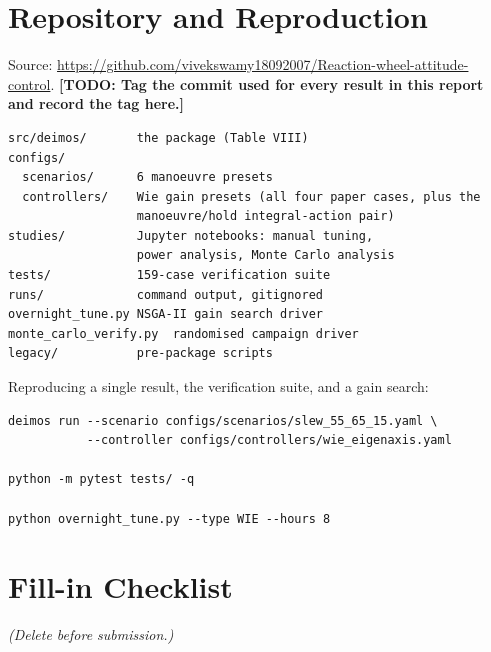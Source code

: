 \documentclass[conference,10pt,a4paper]{IEEEtran}
\newcommand{\TODO}[1]{\textbf{[TODO: #1]}}
\newcommand{\NOTE}[1]{{\small\textit{(#1)}}}
\newcommand{\TODO}[1]{}
\newcommand{\NOTE}[1]{}
\begin{document}
\section{Repository and Reproduction}
\label{app:repo}

Source: \url{https://github.com/vivekswamy18092007/Reaction-wheel-attitude-control}.
\TODO{Tag the commit used for every result in this report and record the tag
here.}

\begin{lstlisting}[caption={Repository layout.},captionpos=b]
src/deimos/       the package (Table VIII)
configs/
  scenarios/      6 manoeuvre presets
  controllers/    Wie gain presets (all four paper cases, plus the
                  manoeuvre/hold integral-action pair)
studies/          Jupyter notebooks: manual tuning,
                  power analysis, Monte Carlo analysis
tests/            159-case verification suite
runs/             command output, gitignored
overnight_tune.py NSGA-II gain search driver
monte_carlo_verify.py  randomised campaign driver
legacy/           pre-package scripts
\end{lstlisting}

Reproducing a single result, the verification suite, and a gain search:

\begin{lstlisting}
deimos run --scenario configs/scenarios/slew_55_65_15.yaml \
           --controller configs/controllers/wie_eigenaxis.yaml

python -m pytest tests/ -q

python overnight_tune.py --type WIE --hours 8
\end{lstlisting}

\section{Fill-in Checklist}
\label{app:checklist}

\NOTE{Delete before submission.}
\end{document}
